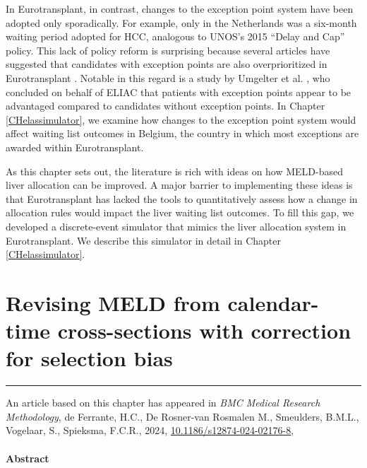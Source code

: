 \documentclass[11pt,twoside,]{book}
\begin{document}
In Eurotransplant, in contrast, changes to the exception point system have been adopted only sporadically. For example, only in the Netherlands was a six-month waiting period
adopted for HCC, analogous to UNOS's 2015 ``Delay and Cap'' policy.
This lack of policy reform is surprising because several articles
have suggested that candidates with exception points are also overprioritized in Eurotransplant
\citep{Goet2017, Metselaar2017}. Notable in this regard is a study by Umgelter et al. \citep{umgelterDisparitiesEurotransplantLiver2017a},
who concluded on behalf of ELIAC that patients with exception points appear to be
advantaged compared to candidates without exception points. In Chapter
\ref{CHelassimulator}, we examine how
changes to the exception point system would affect waiting list outcomes in
Belgium, the country in which most exceptions are awarded within Eurotransplant.

As this chapter sets out, the literature is rich with ideas on how MELD-based
liver allocation can be improved. A major barrier to implementing these ideas is
that Eurotransplant has lacked the tools to quantitatively assess how a change
in allocation rules would impact the
liver waiting list outcomes. To fill this gap,
we developed a discrete-event simulator that mimics the liver allocation system in Eurotransplant.
We describe this simulator in detail in Chapter \ref{CHelassimulator}.

\chapter{Revising MELD from calendar-time cross-sections with correction for selection bias}\label{CHdynremeld}


\vfill

\begin{center}\rule{0.5\linewidth}{0.5pt}\end{center}

\noindent
An article based on this chapter has appeared in \emph{BMC Medical Research Methodology}, de Ferrante, H.C., De Rosner-van Rosmalen M., Smeulders, B.M.L., Vogelaar, S., Spieksma, F.C.R., 2024, \href{https://doi.org/10.1186/s12874-024-02176-8}{10.1186/s12874-024-02176-8},
\citep{deFerranteDynremeld}

\newpage
\normalsize

\subsubsection*{Abstract}
\end{document}
